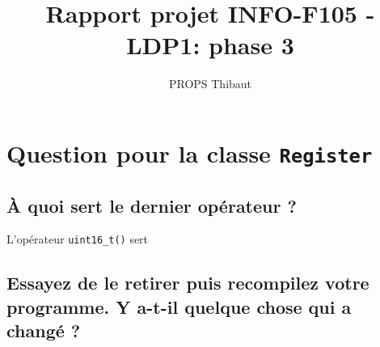\documentclass{article}
\title{Rapport projet INFO-F105 - LDP1: phase 3}
\author{PROPS Thibaut}
\date{}
\begin{document}
\maketitle

\section{Question pour la classe \texttt{Register}}

\subsection{À quoi sert le dernier opérateur ?}
L'opérateur \texttt{uint16_t()} sert 


\subsection{Essayez de le retirer puis recompilez votre programme. Y a-t-il quelque chose qui a changé ?}
\end{document}
